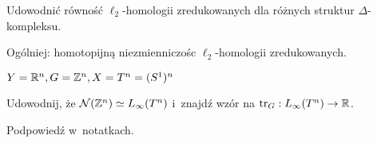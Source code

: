 \begin{cwiczenie}
	Udowodnić równość $\ell_2$-homologii zredukowanych 
	dla różnych struktur $\Delta$-kompleksu.
	
	Ogólniej: homotopijną niezmienniczośc $\ell_2$-homologii
	zredukowanych.
\end{cwiczenie}

\begin{cwiczenie}
	$Y = {\mathbb{R}}^n, G = {\mathbb{Z}}^n, X=T^n = (S^1)^n$
	
	Udowodnij, że ${\mathcal{N}}({\mathbb{Z}}^n) \simeq L_\infty(T^n)$
	i~znajdź wzór na ${\mathrm{tr}}_G: L_\infty(T^n) \to {\mathbb{R}}$.
	
	Podpowiedź w~notatkach.
\end{cwiczenie}












